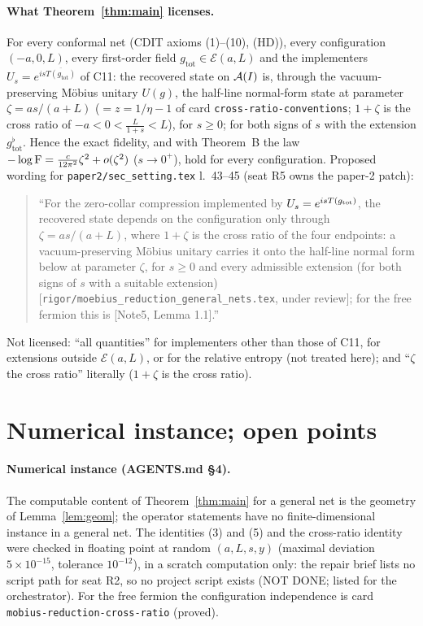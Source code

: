 \documentclass[11pt]{article}
\newcommand{\gtot}{g_{\mathrm{tot}}}
\begin{document}
\paragraph{What Theorem~\ref{thm:main} licenses.}  For every conformal net (CDIT axioms (1)--(10), (HD)), every
configuration $(-a,0,L)$, every first-order field $\gtot\in\mathcal E(a,L)$ and the implementers
$U_s=e^{is\overline{T(\gtot)}}$ of C11: the recovered state on $\mathcal A(I)$ is, through the vacuum-preserving Möbius unitary
$U(g)$, the half-line normal-form state at parameter $\zeta=as/(a+L)$ ($=z=1/\eta-1$ of card
\texttt{cross-ratio-conventions}; $1+\zeta$ is the cross ratio of $-a<0<\frac L{1+s}<L$), for $s\ge0$; for both signs of
$s$ with the extension $\gtot^\flat$.  Hence the exact fidelity, and with Theorem~B the law
$-\log\operatorname{F}=\frac c{12\pi^2}\zeta^2+o(\zeta^2)$ ($s\to0^+$), hold for every configuration.  Proposed wording for
\texttt{paper2/sec\_setting.tex} l.~43--45 (seat R5 owns the paper-2 patch):
\begin{quote}\small
``For the zero-collar compression implemented by $U_s=e^{isT(g_{\rm tot})}$, the recovered state depends on the
configuration only through $\zeta=as/(a+L)$, where $1+\zeta$ is the cross ratio of the four endpoints: a vacuum-preserving
M\"obius unitary carries it onto the half-line normal form below at parameter $\zeta$, for $s\ge0$ and every admissible
extension (for both signs of $s$ with a suitable extension) [\texttt{rigor/moebius\_reduction\_general\_nets.tex},
under review]; for the free fermion this is [Note5, Lemma 1.1].''
\end{quote}
Not licensed: ``all quantities'' for implementers other than those of C11, for extensions outside $\mathcal E(a,L)$, or for
the relative entropy (not treated here); and ``$\zeta$ the cross ratio'' literally ($1+\zeta$ is the cross ratio).

\section{Numerical instance; open points}\label{sec:open}
\paragraph{Numerical instance (AGENTS.md \S4).}  The computable content of Theorem~\ref{thm:main} for a general net is
the geometry of Lemma~\ref{lem:geom}; the operator statements have no finite-dimensional instance in a general net.  The
identities (3) and (5) and the cross-ratio identity were checked in floating point at random $(a,L,s,y)$ (maximal
deviation $5\times10^{-15}$, tolerance $10^{-12}$), in a scratch computation only: the repair brief lists no script path
for seat R2, so no project script exists (NOT DONE; listed for the orchestrator).  For the free fermion the
configuration independence is card \texttt{mobius-reduction-cross-ratio} (proved).
\end{document}

